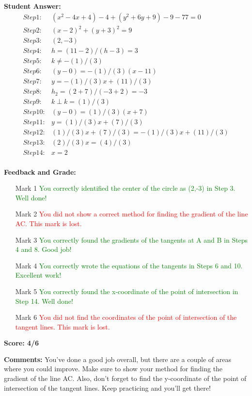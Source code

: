 \documentclass{article}
\begin{document}
\textbf{Student Answer:}
\begin{align*}
Step 1: & (x^{2}-4x+4)-4+(y^{2}+6y+9)-9-77=0 \\
Step 2: & (x-2)^{2}+(y+3)^{2}=9 \\
Step 3: & (2,-3) \\
Step 4: & h=(11-2)/(h-3)=3 \\
Step 5: & k\neq-(1)/(3) \\
Step 6: & (y-0)=-(1)/(3)(x-11) \\
Step 7: & y=-(1)/(3)x+(11)/(3) \\
Step 8: & h_2=(2+7)/(-3+2)=-3 \\
Step 9: & k \perp k=(1)/(3) \\
Step 10: & (y-0)=(1)/(3)(x+7) \\
Step 11: & y=(1)/(3)x+(7)/(3) \\
Step 12: & (1)/(3)x+(7)/(3)=-(1)/(3)x+(11)/(3) \\
Step 13: & (2)/(3)x=(4)/(3) \\
Step 14: & x=2 \\
\end{align*}

\textbf{Feedback and Grade:}
\begin{itemize}
\item[Mark 1] \textcolor{green}{You correctly identified the center of the circle as (2,-3) in Step 3. Well done!}
\item[Mark 2] \textcolor{red}{You did not show a correct method for finding the gradient of the line AC. This mark is lost.}
\item[Mark 3] \textcolor{green}{You correctly found the gradients of the tangents at A and B in Steps 4 and 8. Good job!}
\item[Mark 4] \textcolor{green}{You correctly wrote the equations of the tangents in Steps 6 and 10. Excellent work!}
\item[Mark 5] \textcolor{green}{You correctly found the x-coordinate of the point of intersection in Step 14. Well done!}
\item[Mark 6] \textcolor{red}{You did not find the coordinates of the point of intersection of the tangent lines. This mark is lost.}
\end{itemize}

\textbf{Score: 4/6}

\textbf{Comments:} You've done a good job overall, but there are a couple of areas where you could improve. Make sure to show your method for finding the gradient of the line AC. Also, don't forget to find the y-coordinate of the point of intersection of the tangent lines. Keep practicing and you'll get there!
\end{document}
